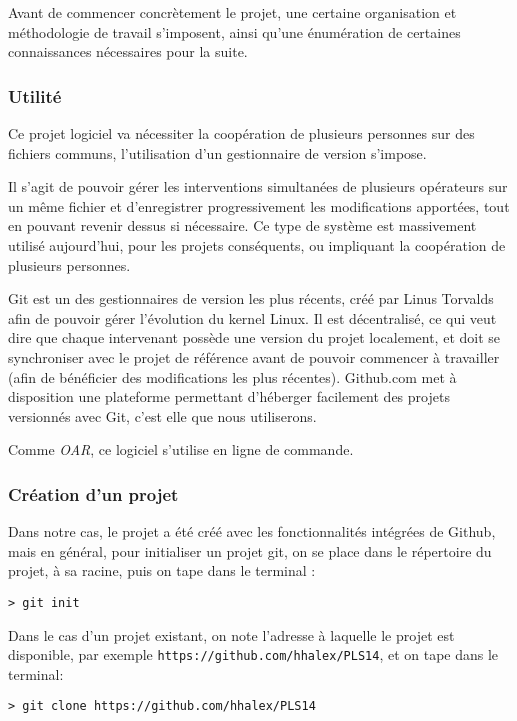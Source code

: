 \par Avant de commencer concrètement le projet, une certaine organisation et méthodologie de travail s'imposent, ainsi qu'une énumération de certaines connaissances nécessaires pour la suite. 

\subsubsection{Utilité}
\label{sec:utilite}

\par Ce projet logiciel va nécessiter la coopération de plusieurs personnes sur des fichiers communs, l'utilisation d'un gestionnaire de version s'impose. 
\par Il s'agit de pouvoir gérer les interventions simultanées de plusieurs opérateurs sur un même fichier et d'enregistrer progressivement les modifications apportées, tout en pouvant revenir dessus si nécessaire. Ce type de système est massivement utilisé aujourd'hui, pour les projets conséquents, ou impliquant la coopération de plusieurs personnes.
\par Git est un des gestionnaires de version les plus récents, créé par Linus Torvalds afin de pouvoir gérer l'évolution du kernel Linux. Il est décentralisé, ce qui veut dire que chaque intervenant possède une version du projet localement, et doit se synchroniser avec le projet de référence avant de pouvoir commencer à travailler (afin de bénéficier des modifications les plus récentes). Github.com met à disposition une plateforme permettant d'héberger facilement des projets versionnés avec Git, c'est elle que nous utiliserons.

\par Comme \emph{OAR}, ce logiciel s'utilise en ligne de commande.

\subsubsection{Création d'un projet}
\label{sec:creation-dun-projet}

\par Dans notre cas, le projet a été créé avec les fonctionnalités intégrées de Github, mais en général, pour initialiser un projet git, on se place dans le répertoire du projet, à sa racine, puis on tape dans le terminal :
\begin{verbatim}
> git init
\end{verbatim}

\par Dans le cas d'un projet existant, on note l'adresse à laquelle le projet est disponible, par exemple \texttt{https://github.com/hhalex/PLS14}, et on tape dans le terminal:
\begin{verbatim}
> git clone https://github.com/hhalex/PLS14
\end{verbatim}

